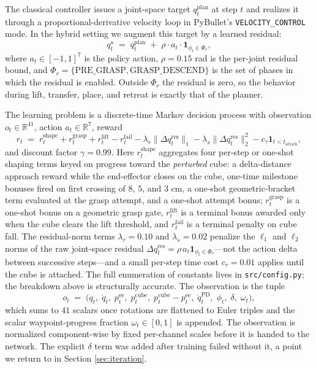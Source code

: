 \documentclass[letterpaper, 11 pt, journal, twoside]{IEEEtran}
\newcommand{\R}{\mathbb{R}}
\begin{document}
The classical controller issues a joint-space target $q^{\mathrm{plan}}_t$ at step $t$ and realizes it through a proportional-derivative velocity loop in PyBullet's {\tt VELOCITY\_CONTROL} mode. In the hybrid setting we augment this target by a learned residual:
\begin{equation}
q^{\star}_t \;=\; q^{\mathrm{plan}}_t \;+\; \rho \cdot a_t \cdot \mathbf{1}_{\phi_t \in \Phi_r},
\label{eq:residual}
\end{equation}
where $a_t \in [-1,1]^7$ is the policy action, $\rho = 0.15$ rad is the per-joint residual bound, and $\Phi_r = \{\text{PRE\_GRASP}, \text{GRASP\_DESCEND}\}$ is the set of phases in which the residual is enabled. Outside $\Phi_r$ the residual is zero, so the behavior during lift, transfer, place, and retreat is exactly that of the planner.

The learning problem is a discrete-time Markov decision process with observation $o_t \in \R^{41}$, action $a_t \in \R^7$, reward
\begin{equation}
r_t \;=\; r^{\mathrm{shape}}_t + r^{\mathrm{grasp}}_t + r^{\mathrm{lift}}_t - r^{\mathrm{fail}}_t - \lambda_r \|\Delta q^{\mathrm{res}}_t\|_1 - \lambda_s \|\Delta q^{\mathrm{res}}_t\|_2^2 - c_\tau \mathbf{1}_{t < t_{\mathrm{attach}}},
\label{eq:reward}
\end{equation}
and discount factor $\gamma = 0.99$. Here $r^{\mathrm{shape}}_t$ aggregates four per-step or one-shot shaping terms keyed on progress toward the {\em perturbed} cube: a delta-distance approach reward while the end-effector closes on the cube, one-time milestone bonuses fired on first crossing of $8$, $5$, and $3$ cm, a one-shot geometric-bracket term evaluated at the grasp attempt, and a one-shot attempt bonus; $r^{\mathrm{grasp}}_t$ is a one-shot bonus on a geometric grasp gate, $r^{\mathrm{lift}}_t$ is a terminal bonus awarded only when the cube clears the lift threshold, and $r^{\mathrm{fail}}_t$ is a terminal penalty on cube fall. The residual-norm terms $\lambda_r = 0.10$ and $\lambda_s = 0.02$ penalize the $\ell_1$ and $\ell_2$ norms of the raw joint-space residual $\Delta q^{\mathrm{res}}_t = \rho\, a_t \mathbf{1}_{\phi_t \in \Phi_r}$---not the action delta between successive steps---and a small per-step time cost $c_\tau = 0.01$ applies until the cube is attached. The full enumeration of constants lives in {\tt src/config.py}; the breakdown above is structurally accurate. The observation is the tuple
\begin{equation}
o_t \;=\; \bigl(q_t,\; \dot q_t,\; p^{\mathrm{ee}}_t,\; p^{\mathrm{cube}}_t,\; p^{\mathrm{cube}}_t - p^{\mathrm{ee}}_t,\; \dot q^{\mathrm{PD}}_t,\; \phi_t,\; \delta,\; \omega_t\bigr),
\label{eq:obs}
\end{equation}
which sums to $41$ scalars once rotations are flattened to Euler triples and the scalar waypoint-progress fraction $\omega_t \in [0,1]$ is appended. The observation is normalized component-wise by fixed per-channel scales before it is handed to the network. The explicit $\delta$ term was added after training failed without it, a point we return to in Section \ref{sec:iteration}.
\end{document}
